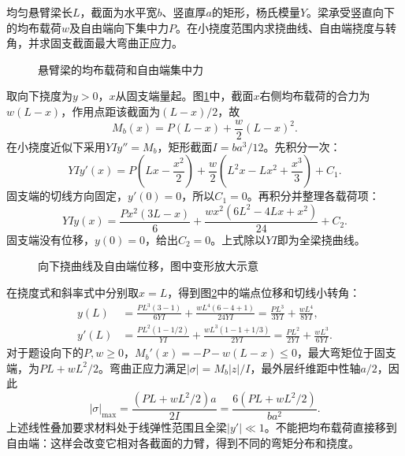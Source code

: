 \begin{exercise}[端力与均布载荷共同弯曲悬臂梁]\label{ex:sup7-beam}
均匀悬臂梁长$L$，截面为水平宽$b$、竖直厚$a$的矩形，杨氏模量$Y$。梁承受竖直向下的均布载荷$w$及自由端向下集中力$P$。在小挠度范围内求挠曲线、自由端挠度与转角，并求固支截面最大弯曲正应力。
\begin{figure}[H]\centering
{}
\caption{悬臂梁的均布载荷和自由端集中力}\label{fig:sup7-beam-q}
\end{figure}
\end{exercise}
\begin{solution}
取向下挠度为$y>0$，$x$从固支端量起。图\ref{fig:sup7-beam-q}中，截面$x$右侧均布载荷的合力为$w(L-x)$，作用点距该截面为$(L-x)/2$，故
\[
 M_b(x)=P(L-x)+\frac w2(L-x)^2.
\]
在小挠度近似下采用$YIy''=M_b$，矩形截面$I=ba^3/12$。先积分一次：
\[
 YIy'(x)=P\left(Lx-\frac{x^2}{2}\right)
 +\frac w2\left(L^2x-Lx^2+\frac{x^3}{3}\right)+C_1.
\]
固支端的切线方向固定，$y'(0)=0$，所以$C_1=0$。再积分并整理各载荷项：
\[
 YIy(x)=\frac{Px^2(3L-x)}6
 +\frac{wx^2(6L^2-4Lx+x^2)}{24}+C_2.
\]
固支端没有位移，$y(0)=0$，给出$C_2=0$。上式除以$YI$即为全梁挠曲线。
\begin{figure}[H]\centering
{}
\caption{向下挠曲线及自由端位移，图中变形放大示意}\label{fig:sup7-beam-s}
\end{figure}
在挠度式和斜率式中分别取$x=L$，得到图\ref{fig:sup7-beam-s}中的端点位移和切线小转角：
\[
 \begin{aligned}
 y(L)&=\frac{PL^3(3-1)}{6YI}
 +\frac{wL^4(6-4+1)}{24YI}
 =\boxed{\frac{PL^3}{3YI}+\frac{wL^4}{8YI}},\\
 y'(L)&=\frac{PL^2(1-1/2)}{YI}
 +\frac{wL^3(1-1+1/3)}{2YI}
 =\boxed{\frac{PL^2}{2YI}+\frac{wL^3}{6YI}}.
 \end{aligned}
\]
对于题设向下的$P,w\ge0$，$M_b'(x)=-P-w(L-x)\le0$，最大弯矩位于固支端，为$PL+wL^2/2$。弯曲正应力满足$|\sigma|=M_b|z|/I$，最外层纤维距中性轴$a/2$，因此
\[
 \boxed{|\sigma|_{\max}
 =\frac{(PL+wL^2/2)a}{2I}
 =\frac{6(PL+wL^2/2)}{ba^2}}.
\]
上述线性叠加要求材料处于线弹性范围且全梁$|y'|\ll1$。不能把均布载荷直接移到自由端：这样会改变它相对各截面的力臂，得到不同的弯矩分布和挠度。
\end{solution}


